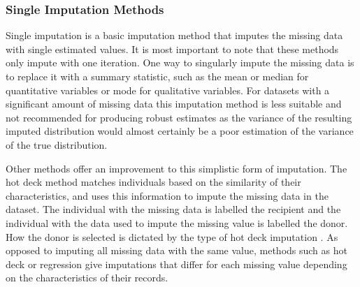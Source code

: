 \documentclass[11pt]{article}
\begin{document}


\subsubsection{Single Imputation Methods}
Single imputation is a basic imputation method that imputes the missing data with single estimated values. It is most important to note that these methods only impute with one iteration. One way to singularly impute the missing data is to replace it with a summary statistic, such as the mean or median for quantitative variables or mode for qualitative variables\cite{Dettori2018}. For datasets with a significant amount of missing data this imputation method is less suitable and not recommended for producing robust estimates as the variance of the resulting imputed distribution would almost certainly be a poor estimation of the variance of the true distribution. 

Other methods offer an improvement to this simplistic form of imputation. The hot deck method matches individuals based on the similarity of their characteristics\cite{Andridge2010}, and uses this information to impute the missing data in the dataset. The individual with the missing data is labelled the recipient and the individual with the data used to impute the missing value is labelled the donor. How the donor is selected is dictated by the type of hot deck imputation \cite{Georgiadis2025}. As opposed to imputing all missing data with the same value, methods such as hot deck or regression give imputations that differ for each missing value depending on the characteristics of their records. 
\end{document}
